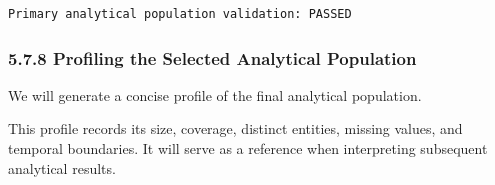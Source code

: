 \documentclass[11pt]{article}
\begin{document}
    \begin{Verbatim}[commandchars=\\\{\}]
Primary analytical population validation: PASSED
    \end{Verbatim}

    \subsubsection{5.7.8 Profiling the Selected Analytical
Population}\label{profiling-the-selected-analytical-population}

We will generate a concise profile of the final analytical population.

This profile records its size, coverage, distinct entities, missing
values, and temporal boundaries. It will serve as a reference when
interpreting subsequent analytical results.
\end{document}

